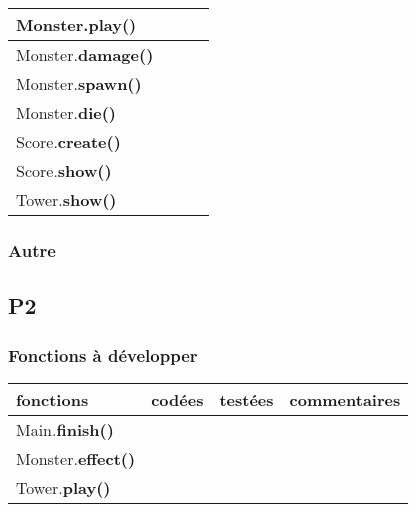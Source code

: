 \documentclass[a4paper]{article}
\begin{document}
\begin{tabular}{|l|c|c|c|}
      \hline
      Monster.\textbf{play()} & & & \\
      \hline
      Monster.\textbf{damage()} & & & \\
      \hline 
      Monster.\textbf{spawn()} & & & \\
      \hline
      Monster.\textbf{die()} & & & \\
      \hline
      \hline
      Score.\textbf{create()} & & & \\
      \hline
      Score.\textbf{show()} & & & \\
      \hline
      \hline
      Tower.\textbf{show()} & & & \\
      \hline
      
        \end{tabular}  
      
            \subsubsection{Autre}
        \subsection{P2}
            \subsubsection{Fonctions à développer}
            \begin{tabular}{|l|c|c|c|}
        \hline
        fonctions & codées & testées & commentaires \\
        \hline
        Main.\textbf{finish()} & & & \\
        \hline
        \hline
        Monster.\textbf{effect()} & & & \\
        \hline
        \hline
        Tower.\textbf{play()} & & & \\
        \hline 
        \end{tabular}
\end{document}
